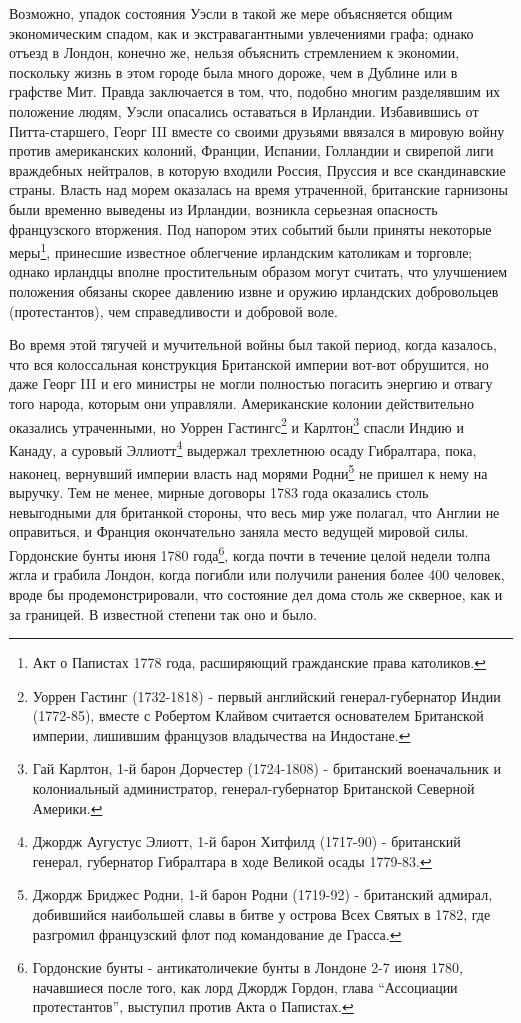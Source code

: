 \documentclass[
  oneside,
  12pt,
  titlepage]{book}
\begin{document}
Возможно, упадок состояния Уэсли в такой же мере объясняется общим экономическим спадом, как и экстравагантными увлечениями графа; однако отъезд в Лондон, конечно же, нельзя объяснить стремлением к экономии, поскольку жизнь в этом городе была много дороже, чем в Дублине или в графстве Мит. Правда заключается в том, что, подобно многим разделявшим их положение людям, Уэсли опасались оставаться в Ирландии. Избавившись от Питта-старшего, Георг III вместе со своими друзьями ввязался в мировую войну против американских колоний, Франции, Испании, Голландии и свирепой лиги враждебных нейтралов, в которую входили Россия, Пруссия и все скандинавские страны. Власть над морем оказалась на время утраченной, британские гарнизоны были временно выведены из Ирландии, возникла серьезная опасность французского вторжения. Под напором этих событий были приняты некоторые меры\footnote{Акт о Папистах 1778 года, расширяющий гражданские права католиков.}, принесшие известное облегчение ирландским католикам и торговле; однако ирландцы вполне простительным образом могут считать, что улучшением положения обязаны скорее давлению извне и оружию ирландских добровольцев (протестантов), чем справедливости и добровой воле.

Во время этой тягучей и мучительной войны был такой период, когда казалось, что вся колоссальная конструкция Британской империи вот-вот обрушится, но даже Георг III и его министры не могли полностью погасить энергию и отвагу того народа, которым они управляли. Американские колонии действительно оказались утраченными, но Уоррен Гастингс\footnote{Уоррен Гастинг (1732-1818) - первый английский генерал-губернатор Индии (1772-85), вместе с Робертом Клайвом считается основателем Британской империи, лишившим французов владычества на Индостане.} и Карлтон\footnote{Гай Карлтон, 1-й барон Дорчестер (1724-1808) - британский военачальник и колониальный администратор, генерал-губернатор Британской Северной Америки.} спасли Индию и Канаду, а суровый Эллиотт\footnote{Джордж Аугустус Элиотт, 1-й барон Хитфилд (1717-90) - британский генерал, губернатор Гибралтара в ходе Великой осады 1779-83.} выдержал трехлетнюю осаду Гибралтара, пока, наконец, вернувший империи власть над морями Родни\footnote{Джордж Бриджес Родни, 1-й барон Родни (1719-92) - британский адмирал, добившийся наибольшей славы в битве у острова Всех Святых в 1782, где разгромил французский флот под командование де Грасса.} не пришел к нему на выручку. Тем не менее, мирные договоры 1783 года оказались столь невыгодными для британкой стороны, что весь мир уже полагал, что Англии не оправиться, и Франция окончательно заняла место ведущей мировой силы. Гордонские бунты июня 1780 года\footnote{Гордонские бунты - антикатоличекие бунты в Лондоне 2-7 июня 1780, начавшиеся после того, как лорд Джордж Гордон, глава ``Ассоциации протестантов'', выступил против Акта о Папистах.}, когда почти в течение целой недели толпа жгла и грабила Лондон, когда погибли или получили ранения более 400 человек, вроде бы продемонстрировали, что состояние дел дома столь же скверное, как и за границей. В известной степени так оно и было.
\end{document}
